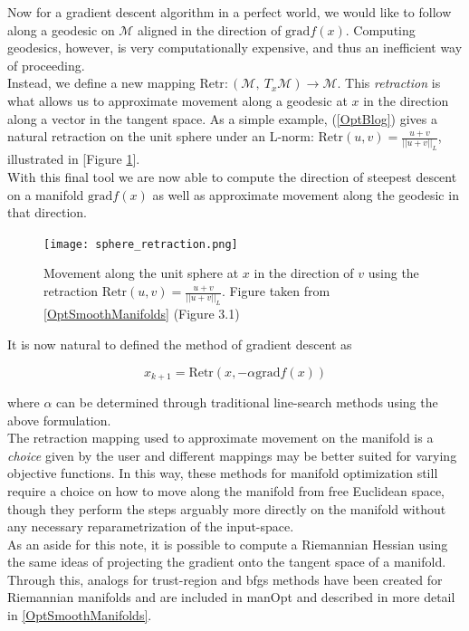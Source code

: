 \documentclass{article}
\begin{document}
Now for a gradient descent algorithm in a perfect world, we would like to follow along a geodesic on $\mathcal{M}$ aligned in the direction of $\text{grad}f(x)$. Computing geodesics, however, is very computationally expensive, and thus an inefficient way of proceeding.\\ Instead, we define a new mapping $\text{Retr}: (\mathcal{M}, \ T_x \mathcal{M}) \to \mathcal{M}$. This \textit{retraction} is what allows us to approximate movement along a geodesic at $x$ in the direction along a vector in the tangent space. As a simple example, (\ref{OptBlog}) gives a natural retraction on the unit sphere under an L-norm: $\text{Retr}(u, v)= \frac{u+v}{||u + v||_L}$, illustrated in [Figure \ref{sphere_retraction}].\\ With this final tool we are now able to compute the direction of steepest descent on a manifold $\text{grad}f(x)$ as well as approximate movement along the geodesic in that direction. 

\begin{figure}[h]
    \centering
    \texttt{[image: sphere\_retraction.png]}
    \caption{Movement along the unit sphere at $x$ in the direction of $v$ using the retraction $\text{Retr}(u, v)= \frac{u+v}{||u + v||_L}$. Figure taken from \ref{OptSmoothManifolds} (Figure 3.1)}
    \label{sphere_retraction}
\end{figure}

It is now natural to defined the method of gradient descent as 

\[x_{k+1} = \text{Retr}(x, -\alpha \text{grad}f(x))\]

where $\alpha$ can be determined through traditional line-search methods using the above formulation. \\
The retraction mapping used to approximate movement on the manifold is a \textit{choice} given by the user and different mappings may be better suited for varying objective functions. In this way, these methods for manifold optimization still require a choice on how to move along the manifold from free Euclidean space, though they perform the steps arguably more directly on the manifold without any necessary reparametrization of the input-space.\\

As an aside for this note, it is possible to compute a Riemannian Hessian using the same ideas of projecting the gradient onto the tangent space of a manifold. Through this, analogs for trust-region and bfgs methods have been created for Riemannian manifolds and are included in manOpt and described in more detail in \ref{OptSmoothManifolds}.
\end{document}
